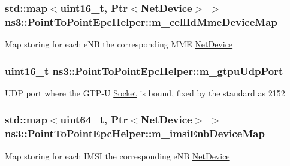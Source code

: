 \subsubsection[{\texorpdfstring{m\+\_\+cell\+Id\+Mme\+Device\+Map}{m_cellIdMmeDeviceMap}}]{\setlength{\rightskip}{0pt plus 5cm}std\+::map$<$uint16\+\_\+t, {\bf Ptr}$<${\bf Net\+Device}$>$ $>$ ns3\+::\+Point\+To\+Point\+Epc\+Helper\+::m\+\_\+cell\+Id\+Mme\+Device\+Map\hspace{0.3cm}{\ttfamily [private]}}\hypertarget{classns3_1_1PointToPointEpcHelper_adcf4ad1441a86ec2cddb57db3a1b0734}{}\label{classns3_1_1PointToPointEpcHelper_adcf4ad1441a86ec2cddb57db3a1b0734}
Map storing for each e\+NB the corresponding M\+ME \hyperlink{classns3_1_1NetDevice}{Net\+Device} 
\subsubsection[{\texorpdfstring{m\+\_\+gtpu\+Udp\+Port}{m_gtpuUdpPort}}]{\setlength{\rightskip}{0pt plus 5cm}uint16\+\_\+t ns3\+::\+Point\+To\+Point\+Epc\+Helper\+::m\+\_\+gtpu\+Udp\+Port\hspace{0.3cm}{\ttfamily [private]}}\hypertarget{classns3_1_1PointToPointEpcHelper_afe0543e08ac6d9ed1861e0685ca06ab1}{}\label{classns3_1_1PointToPointEpcHelper_afe0543e08ac6d9ed1861e0685ca06ab1}
U\+DP port where the G\+T\+P-\/U \hyperlink{classns3_1_1Socket}{Socket} is bound, fixed by the standard as 2152 
\subsubsection[{\texorpdfstring{m\+\_\+imsi\+Enb\+Device\+Map}{m_imsiEnbDeviceMap}}]{\setlength{\rightskip}{0pt plus 5cm}std\+::map$<$uint64\+\_\+t, {\bf Ptr}$<${\bf Net\+Device}$>$ $>$ ns3\+::\+Point\+To\+Point\+Epc\+Helper\+::m\+\_\+imsi\+Enb\+Device\+Map\hspace{0.3cm}{\ttfamily [private]}}\hypertarget{classns3_1_1PointToPointEpcHelper_aee5fc5df60d9d99903e7d5c2a5473f59}{}\label{classns3_1_1PointToPointEpcHelper_aee5fc5df60d9d99903e7d5c2a5473f59}
Map storing for each I\+M\+SI the corresponding e\+NB \hyperlink{classns3_1_1NetDevice}{Net\+Device} 
